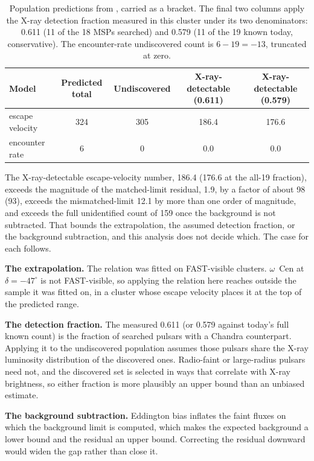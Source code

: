 \documentclass[11pt]{article}
\newcommand{\ocen}{$\omega$~Cen}
\begin{document}
\begin{table}[tbp]
\centering
\small
\caption{Population predictions from \citet{Yin2024}, carried as a bracket. The final two columns apply the X-ray detection fraction measured in this cluster under its two denominators: 0.611 (11 of the 18 MSPs \citet{ZhaoHeinke2023} searched) and 0.579 (11 of the 19 known today, conservative). The encounter-rate undiscovered count is $6-19=-13$, truncated at zero.}
\label{tab:pop}
\begin{tabular}{lcccc}
\toprule
Model & Predicted total & Undiscovered & X-ray-detectable (0.611) & X-ray-detectable (0.579) \\
\midrule
escape velocity & 324 & 305 & 186.4 & 176.6 \\
encounter rate  & 6   & 0   & 0.0   & 0.0 \\
\bottomrule
\end{tabular}
\end{table}

The X-ray-detectable escape-velocity number, 186.4 (176.6 at the all-19 fraction), exceeds the magnitude of the matched-limit residual, 1.9, by a factor of about 98 (93), exceeds the mismatched-limit 12.1 by more than one order of magnitude, and exceeds the full unidentified count of 159 once the background is not subtracted. That bounds the extrapolation, the assumed detection fraction, or the background subtraction, and this analysis does not decide which. The case for each follows.

\textbf{The extrapolation.} The \citet{Yin2024} relation was fitted on FAST-visible clusters. \ocen{} at $\delta = -47^{\circ}$ is not FAST-visible, so applying the relation here reaches outside the sample it was fitted on, in a cluster whose escape velocity places it at the top of the predicted range.

\textbf{The detection fraction.} The measured 0.611 (or 0.579 against today's full known count) is the fraction of searched pulsars with a Chandra counterpart. Applying it to the undiscovered population assumes those pulsars share the X-ray luminosity distribution of the discovered ones. Radio-faint or large-radius pulsars need not, and the discovered set is selected in ways that correlate with X-ray brightness, so either fraction is more plausibly an upper bound than an unbiased estimate.

\textbf{The background subtraction.} Eddington bias inflates the faint fluxes on which the background limit is computed, which makes the expected background a lower bound and the residual an upper bound. Correcting the residual downward would widen the gap rather than close it.
\end{document}
